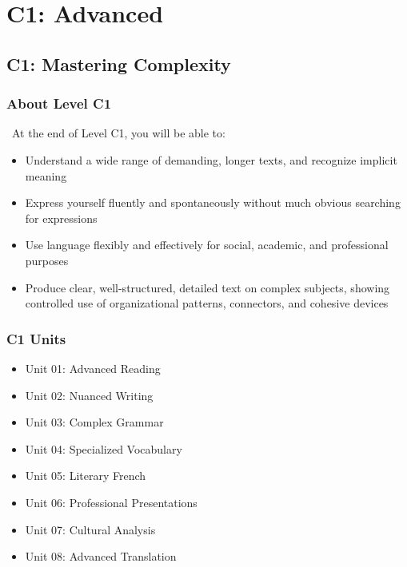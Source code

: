 
\part{C1: Advanced}
\label{part:c1}

\chapter{C1: Mastering Complexity}
\label{chap:c1}

\section*{About Level C1}

\levelCone\ At the end of Level C1, you will be able to:

\begin{itemize}
\item Understand a wide range of demanding, longer texts, and recognize implicit meaning
\item Express yourself fluently and spontaneously without much obvious searching for expressions
\item Use language flexibly and effectively for social, academic, and professional purposes
\item Produce clear, well-structured, detailed text on complex subjects, showing controlled use of organizational patterns, connectors, and cohesive devices
\end{itemize}

\section*{C1 Units}
\begin{itemize}
\item Unit 01: Advanced Reading
\item Unit 02: Nuanced Writing
\item Unit 03: Complex Grammar
\item Unit 04: Specialized Vocabulary
\item Unit 05: Literary French
\item Unit 06: Professional Presentations
\item Unit 07: Cultural Analysis
\item Unit 08: Advanced Translation
\end{itemize}

